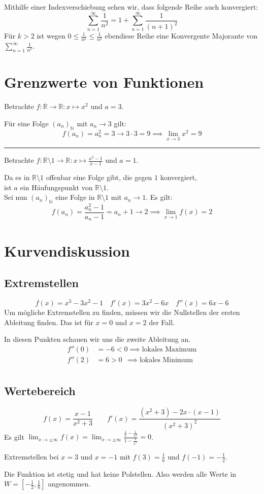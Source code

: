 \documentclass[10pt,a4paper]{article}
\begin{document}
\begin{multicols*}{2}
Mithilfe einer Indexverschiebung sehen wir, dass folgende Reihe auch konvergiert:
\[\sum_{n=1}^\infty\frac{1}{n^2}=1+\sum_{n=1}^\infty\frac{1}{(n+1)^2}\]
Für $k>2$ ist wegen $0\le\frac{1}{n^k}\le\frac{1}{n^2}$ ebendiese Reihe eine Konvergente Majorante von $\sum_{n=1}^\infty\frac{1}{n^k}$.

\section*{Grenzwerte von Funktionen}

Betrachte $f: \mathbb{R}\to\mathbb{R}: x\mapsto x^2$ und $a=3$.

Für eine Folge $(a_n)_{\mathbb{N}}$ mit $a_n\to3$ gilt:
\[f(a_n)=a_n^2=3 \longrightarrow 3\cdot3=9 \implies \lim_{x\to3}x^2=9\]

\hrule\vspace{1em}

Betrachte $\displaystyle f: \mathbb{R}\setminus1\to\mathbb{R}:x\mapsto\frac{x^2-1}{x-1}$ und $a=1$.

Da es in $\mathbb{R}\setminus1$ offenbar eine Folge gibt, die gegen $1$ konvergiert,\\
ist $a$ ein Häufungspunkt von $\mathbb{R}\setminus1$.\\
Sei nun $(a_n)_{\mathbb{N}}$ eine Folge in $\mathbb{R}\setminus1$ mit $a_n\to1$. Es gilt:
\[f(a_n)=\frac{a_n^2-1}{a_n-1}=a_n+1\to2 \implies \lim_{x\to1}f(x)=2\]

\section*{Kurvendiskussion}

\subsection*{Extremstellen}
\[f(x)=x^3-3x^2-1 \quad f'(x)=3x^2-6x \quad f''(x)=6x-6\]
Um mögliche Extremstellen zu finden, müssen wir die Nullstellen der ersten Ableitung finden.
Das ist für $x=0$ und $x=2$ der Fall.

In diesen Punkten schauen wir uns die zweite Ableitung an.
\begin{align*}
	f''(0)&=-6<0 \implies \text{lokales Maximum} \\
	f''(2)&=6>0 ~~\implies \text{lokales Minimum} \\
\end{align*}

\subsection*{Wertebereich}
\[f(x)=\frac{x-1}{x^2+3} \qquad f'(x)=\frac{(x^2+3)-2x\cdot(x-1)}{(x^2+3)^2}\]
Es gilt $\displaystyle \lim_{x\to\pm\infty}f(x)=\lim_{x\to\pm\infty}\frac{\frac{1}{x}-\frac{1}{x^2}}{1-\frac{3}{x^2}}=0$.

Extremstellen bei $x=3$ und $x=-1$ mit $f(3)=\frac{1}{6}$ und $f(-1)=-\frac{1}{2}$.

Die Funktion ist stetig und hat keine Polstellen.
Also werden alle Werte in $W=[-\frac{1}{2},\frac{1}{6}]$ angenommen.

\end{multicols*}
\end{document}
